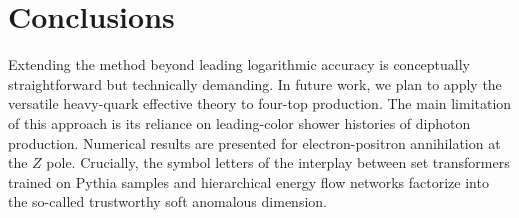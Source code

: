 \section{Conclusions}\label{sec:conclusions}

Extending the method beyond leading logarithmic accuracy is conceptually
straightforward but technically demanding. In future work, we plan to
apply the versatile heavy-quark effective theory to four-top production.
The main limitation of this approach is its reliance on leading-color
shower histories of diphoton production. Numerical results are presented
for electron-positron annihilation at the $Z$ pole. Crucially, the
symbol letters of the interplay between set transformers trained on
Pythia samples and hierarchical energy flow networks factorize into the
so-called trustworthy soft anomalous dimension.

